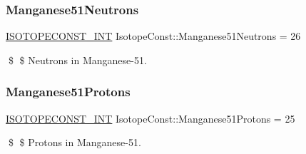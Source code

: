 \subsubsection{\texorpdfstring{Manganese51\+Neutrons}{Manganese51Neutrons}}
{\footnotesize\ttfamily \mbox{\hyperlink{group___isotope_const-_macros_ga5f18360b3e99483a35c32d789e62621c}{I\+S\+O\+T\+O\+P\+E\+C\+O\+N\+S\+T\+\_\+\+I\+NT}} Isotope\+Const\+::\+Manganese51\+Neutrons = 26}

\$ \$ Neutrons in Manganese-\/51. \mbox{\label{group___isotope_const-_manganese-_mn51_ga743c6e7a55032f9bea08211001139ab3}} 
\subsubsection{\texorpdfstring{Manganese51\+Protons}{Manganese51Protons}}
{\footnotesize\ttfamily \mbox{\hyperlink{group___isotope_const-_macros_ga5f18360b3e99483a35c32d789e62621c}{I\+S\+O\+T\+O\+P\+E\+C\+O\+N\+S\+T\+\_\+\+I\+NT}} Isotope\+Const\+::\+Manganese51\+Protons = 25}

\$ \$ Protons in Manganese-\/51. 